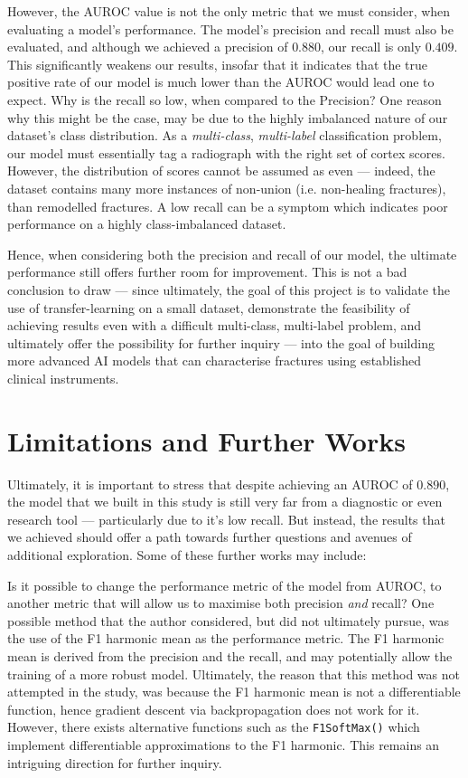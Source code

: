 However, the AUROC value is not the only metric that we must consider, when evaluating a model's performance. The model's precision and recall must also be evaluated, and although we achieved a precision of \(0.880\), our recall is only \(0.409\). This significantly weakens our results, insofar that it indicates that the true positive rate of our model is much lower than the AUROC would lead one to expect. Why is the recall so low, when compared to the Precision? One reason why this might be the case, may be due to the highly imbalanced nature of our dataset's class distribution. As a \emph{multi-class}, \emph{multi-label} classification problem, our model must essentially tag a radiograph with the right set of cortex scores. However, the distribution of scores cannot be assumed as even --- indeed, the dataset contains many more instances of non-union (i.e. non-healing fractures), than remodelled fractures. A low recall can be a symptom which indicates poor performance on a highly class-imbalanced dataset.

Hence, when considering both the precision and recall of our model, the ultimate performance still offers further room for improvement. This is not a bad conclusion to draw --- since ultimately, the goal of this project is to validate the use of transfer-learning on a small dataset, demonstrate the feasibility of achieving results even with a difficult multi-class, multi-label problem, and ultimately offer the possibility for further inquiry --- into the goal of building more advanced AI models that can characterise fractures using established clinical instruments.

\section{Limitations and Further Works}

Ultimately, it is important to stress that despite achieving an AUROC of \(0.890\), the model that we built in this study is still very far from a diagnostic or even research tool --- particularly due to it's low recall. But instead, the results that we achieved should offer a path towards further questions and avenues of additional exploration. Some of these further works may include:

Is it possible to change the performance metric of the model from AUROC, to another metric that will allow us to maximise both precision \emph{and} recall? One possible method that the author considered, but did not ultimately pursue, was the use of the F1 harmonic mean as the performance metric. The F1 harmonic mean is derived from the precision and the recall, and may potentially allow the training of a more robust model. Ultimately, the reason that this method was not attempted in the study, was because the F1 harmonic mean is not a differentiable function, hence gradient descent via backpropagation does not work for it. However, there exists alternative functions such as the \texttt{F1SoftMax()} which implement differentiable approximations to the F1 harmonic. This remains an intriguing direction for further inquiry.

